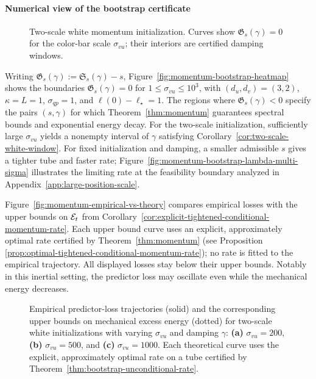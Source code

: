 \paragraph{Numerical view of the bootstrap certificate}
\begin{figure}
\centering
{}
\footnotesize
\captionsetup{font=footnotesize,skip=2pt}
\caption{Two-scale white momentum initialization. Curves show
$\mathfrak G_s(\gamma)=0$ for the color-bar scale $\sigma_{vu}$;
their interiors are certified damping windows.}
\label{fig:momentum-bootstrap-heatmap}\label{fig:momentum-window}
\end{figure}
Writing $\mathfrak G_s(\gamma):=\mathfrak S_s(\gamma)-s$, Figure~\ref{fig:momentum-bootstrap-heatmap} shows the boundaries
$\mathfrak G_s(\gamma)=0$ for $1\le\sigma_{vu}\le10^3$, with $(d_u,d_v)=(3,2)$,
$\kappa=L=1$, $\sigma_{qp}=1$, and $\ell(0)-\ell_\star=1$.
The regions where $\mathfrak G_s(\gamma)<0$ specify the pairs $(s,\gamma)$ for which Theorem~\ref{thm:momentum} guarantees spectral bounds and exponential energy decay.
For the two-scale initialization, sufficiently large $\sigma_{vu}$ yields a nonempty interval of $\gamma$ satisfying Corollary~\ref{cor:two-scale-white-window}.
For fixed initialization and damping, a smaller admissible $s$ gives a
tighter tube and faster rate; Figure~\ref{fig:momentum-bootstrap-lambda-multi-sigma}
illustrates the limiting rate at the feasibility boundary analyzed in
Appendix~\ref{app:large-position-scale}.

Figure~\ref{fig:momentum-empirical-vs-theory} compares empirical losses with the upper bounds on $\mathcal E_t$ from Corollary~\ref{cor:explicit-tightened-conditional-momentum-rate}.
Each upper bound curve uses an explicit, approximately optimal rate certified by Theorem~\ref{thm:momentum} (see Proposition \ref{prop:optimal-tightened-conditional-momentum-rate}); no rate is fitted
to the empirical trajectory. All displayed losses stay below their upper bounds.
Notably in this inertial setting, the predictor loss may oscillate even while the mechanical energy decreases.

\begin{figure}[!htbp]
\centering
{}
\captionsetup{font=footnotesize,skip=2pt}
\caption{
Empirical predictor-loss trajectories (solid) and the corresponding upper bounds
on mechanical excess energy (dotted) for two-scale white initializations with varying
\(\sigma_{vu}\) and damping \(\gamma\): \textbf{(a)} $\sigma_{vu}=200$,
\textbf{(b)} $\sigma_{vu}=500$, and \textbf{(c)} $\sigma_{vu}=1000$.
Each theoretical curve uses the explicit, approximately optimal rate on a tube certified by
Theorem~\ref{thm:bootstrap-unconditional-rate}.
}
\label{fig:momentum-empirical-vs-theory}\label{fig:momentum-envelopes}
\end{figure}
\WFclear

